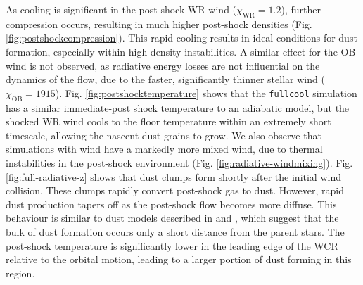 \documentclass[fleqn,usenatbib]{mnras}
\begin{document}
As cooling is significant in the post-shock WR wind ($\chi_\text{WR} = 1.2$), further compression occurs, resulting in much higher post-shock densities (Fig. \ref{fig:postshockcompression}).
This rapid cooling results in ideal conditions for dust formation, especially within high density instabilities.
A similar effect for the OB wind is not observed, as radiative energy losses are not influential on the dynamics of the flow, due to the faster, significantly thinner stellar wind ($\chi_\text{OB} = 1915$).
Fig. \ref{fig:postshocktemperature} shows that the \texttt{fullcool} simulation has a similar immediate-post shock temperature to an adiabatic model, but the shocked WR wind cools to the floor temperature within an extremely short timescale, allowing the nascent dust grains to grow.
We also observe that simulations with wind have a markedly more mixed wind, due to thermal instabilities in the post-shock environment (Fig. \ref{fig:radiative-windmixing}).
Fig. \ref{fig:full-radiative-z} shows that dust clumps form shortly after the initial wind collision.
These clumps rapidly convert post-shock gas to dust.
However, rapid dust production tapers off as the post-shock flow becomes more diffuse.
This behaviour is similar to dust models described in \cite{harriesThreedimensionalDustRadiativetransfer2004} and \cite{hendrix_pinwheels_2016}, which suggest that the bulk of dust formation occurs only a short distance from the parent stars.
The post-shock temperature is significantly lower in the leading edge of the WCR relative to the orbital motion, leading to a larger portion of dust forming in this region.
\end{document}
